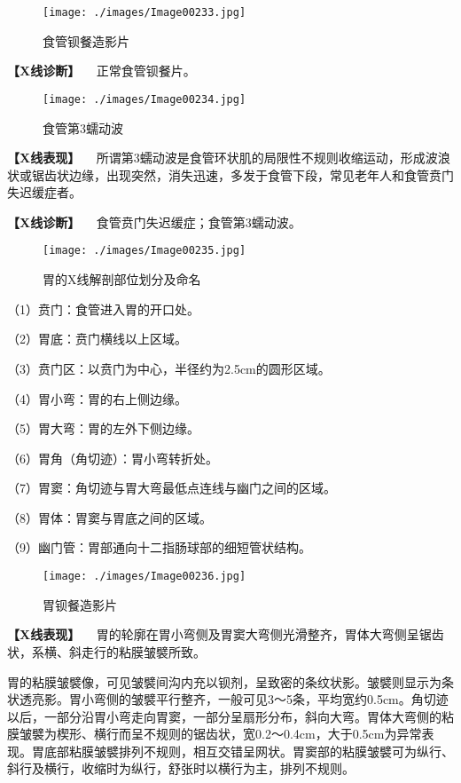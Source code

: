 \begin{figure}[!htbp]
 \centering
 \texttt{[image: ./images/Image00233.jpg]}
 \captionsetup{justification=centering}
 \caption{食管钡餐造影片}
 \label{fig5-1-1}
  \end{figure} 

\textbf{【X线诊断】} 　正常食管钡餐片。

\begin{figure}[!htbp]
 \centering
 \texttt{[image: ./images/Image00234.jpg]}
 \captionsetup{justification=centering}
 \caption{食管第3蠕动波}
 \label{fig5-1-2}
  \end{figure} 

\textbf{【X线表现】}
　所谓第3蠕动波是食管环状肌的局限性不规则收缩运动，形成波浪状或锯齿状边缘，出现突然，消失迅速，多发于食管下段，常见老年人和食管贲门失迟缓症者。

\textbf{【X线诊断】} 　食管贲门失迟缓症；食管第3蠕动波。

\begin{figure}[!htbp]
 \centering
 \texttt{[image: ./images/Image00235.jpg]}
 \captionsetup{justification=centering}
 \caption{胃的X线解剖部位划分及命名}
 \label{fig5-1-3}
  \end{figure} 

（1）贲门：食管进入胃的开口处。

（2）胃底：贲门横线以上区域。

（3）贲门区：以贲门为中心，半径约为2.5cm的圆形区域。

（4）胃小弯：胃的右上侧边缘。

（5）胃大弯：胃的左外下侧边缘。

（6）胃角（角切迹）：胃小弯转折处。

（7）胃窦：角切迹与胃大弯最低点连线与幽门之间的区域。

（8）胃体：胃窦与胃底之间的区域。

（9）幽门管：胃部通向十二指肠球部的细短管状结构。

\begin{figure}[!htbp]
 \centering
 \texttt{[image: ./images/Image00236.jpg]}
 \captionsetup{justification=centering}
 \caption{胃钡餐造影片}
 \label{fig5-1-4}
  \end{figure} 

\textbf{【X线表现】}
　胃的轮廓在胃小弯侧及胃窦大弯侧光滑整齐，胃体大弯侧呈锯齿状，系横、斜走行的粘膜皱襞所致。

胃的粘膜皱襞像，可见皱襞间沟内充以钡剂，呈致密的条纹状影。皱襞则显示为条状透亮影。胃小弯侧的皱襞平行整齐，一般可见3～5条，平均宽约0.5cm。角切迹以后，一部分沿胃小弯走向胃窦，一部分呈扇形分布，斜向大弯。胃体大弯侧的粘膜皱襞为楔形、横行而呈不规则的锯齿状，宽0.2～0.4cm，大于0.5cm为异常表现。胃底部粘膜皱襞排列不规则，相互交错呈网状。胃窦部的粘膜皱襞可为纵行、斜行及横行，收缩时为纵行，舒张时以横行为主，排列不规则。

